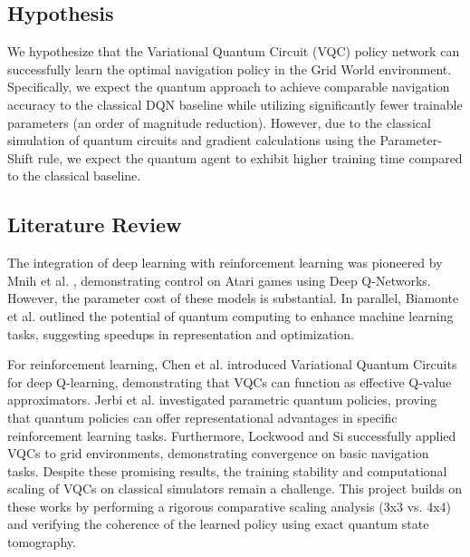 \documentclass[12pt, a4paper]{article}
\begin{document}
\subsection{Hypothesis}

We hypothesize that the Variational Quantum Circuit (VQC) policy network can successfully learn the optimal navigation policy in the Grid World environment. Specifically, we expect the quantum approach to achieve comparable navigation accuracy to the classical DQN baseline while utilizing significantly fewer trainable parameters (an order of magnitude reduction). However, due to the classical simulation of quantum circuits and gradient calculations using the Parameter-Shift rule, we expect the quantum agent to exhibit higher training time compared to the classical baseline.

\subsection{Literature Review}

The integration of deep learning with reinforcement learning was pioneered by Mnih et al. \cite{mnih2015}, demonstrating control on Atari games using Deep Q-Networks. However, the parameter cost of these models is substantial. In parallel, Biamonte et al. \cite{biamonte2017} outlined the potential of quantum computing to enhance machine learning tasks, suggesting speedups in representation and optimization. 

For reinforcement learning, Chen et al. \cite{chen2020} introduced Variational Quantum Circuits for deep Q-learning, demonstrating that VQCs can function as effective Q-value approximators. Jerbi et al. \cite{jerbi2021} investigated parametric quantum policies, proving that quantum policies can offer representational advantages in specific reinforcement learning tasks. Furthermore, Lockwood and Si \cite{lockwood2020} successfully applied VQCs to grid environments, demonstrating convergence on basic navigation tasks. Despite these promising results, the training stability and computational scaling of VQCs on classical simulators remain a challenge. This project builds on these works by performing a rigorous comparative scaling analysis (3x3 vs. 4x4) and verifying the coherence of the learned policy using exact quantum state tomography.

\newpage

\end{document}
